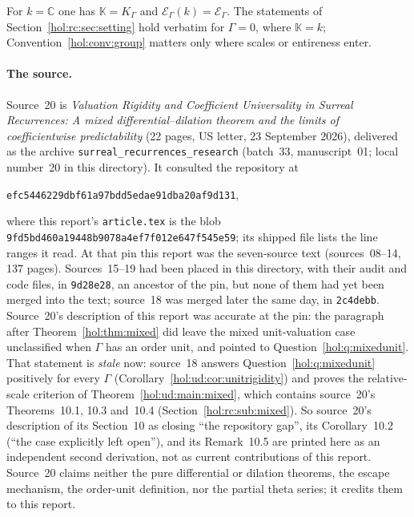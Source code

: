 \documentclass[11pt]{article}
\numberwithin{equation}{section}
\theoremstyle{definition}
\theoremstyle{remark}
\newcommand{\C}{\mathbb C}
\newcommand{\K}{K_\Gamma}
\newcommand{\E}{\mathcal E_\Gamma}
\newcommand{\KK}{\mathbb K}
\newcommand{\EK}{\mathcal E_\Gamma(k)}
\begin{document}
For $k=\C$ one has $\KK=\K$ and $\EK=\E$. The statements of
Section~\ref{hol:rc:sec:setting} hold verbatim for $\Gamma=0$, where $\KK=k$;
Convention~\ref{hol:conv:group} matters only where scales or entireness enter.

\paragraph{The source.}
Source~20 is \emph{Valuation Rigidity and Coefficient Universality in Surreal
Recurrences: A mixed differential--dilation theorem and the limits of
coefficientwise predictability} (22 pages, US letter, 23 September 2026),
delivered as the archive \texttt{surreal\_recurrences\_research} (batch~33,
manuscript~01; local number~20 in this directory). It consulted the repository
at
\begin{center}\small\texttt{efc5446229dbf61a97bdd5edae91dba20af9d131},\end{center}
where this report's \texttt{article.tex} is the blob
\texttt{9fd5bd460a19448b9078a4ef7f012e647f545e59}; its shipped file
 lists the line ranges it read. At that
pin this report was the seven-source text (sources~08--14, 137 pages).
Sources~15--19 had been placed in this directory, with their audit and code
files, in \texttt{9d28e28}, an ancestor of the pin, but none of them had yet
been merged into the text; source~18 was merged later the same day, in
\texttt{2c4debb}. Source~20's description of this report was accurate at the
pin: the paragraph after Theorem~\ref{hol:thm:mixed} did leave the mixed
unit-valuation case unclassified when $\Gamma$ has an order unit, and pointed to
Question~\ref{hol:q:mixedunit}. That statement is \emph{stale} now:
source~18 answers Question~\ref{hol:q:mixedunit} positively for every
$\Gamma$ (Corollary~\ref{hol:ud:cor:unitrigidity}) and proves the
relative-scale criterion of Theorem~\ref{hol:ud:main:mixed}, which contains
source~20's Theorems~10.1, 10.3 and~10.4 (Section~\ref{hol:rc:sub:mixed}).
So source~20's description of its Section~10 as closing ``the repository gap'',
its Corollary~10.2 (``the case explicitly left open''), and its Remark~10.5 are
printed here as an independent second derivation, not as current
contributions of this report. Source~20 claims neither the pure differential
or dilation theorems, the escape mechanism, the order-unit definition, nor the
partial theta series; it credits them to this report.
\end{document}
